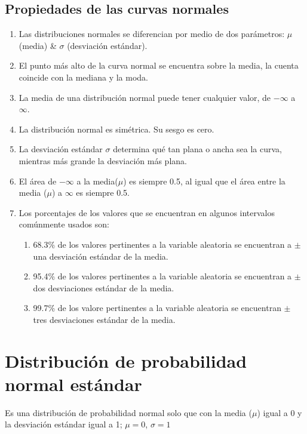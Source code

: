 \documentclass{article}
\begin{document}
\subsection{Propiedades de las curvas normales}
\begin{enumerate}
    \item Las distribuciones normales se diferencian por medio de dos parámetros: $\mu$ (media) \& $\sigma$ (desviación estándar).
    \item El punto más alto de la curva normal se encuentra sobre la media, la cuenta coincide con la mediana y la moda.
    \item La media de una distribución normal puede tener cualquier valor, de $-\infty$ a $\infty$.
    \item La distribución normal es simétrica. Su sesgo es cero. 
    \item La desviación estándar $\sigma$ determina qué tan plana o ancha sea la curva, mientras más grande la desviación más plana. 
    \item El área de $-\infty$ a la media($\mu$) es siempre 0.5, al igual que el área entre la media ($\mu$) a $\infty$ es siempre 0.5.
    \item Los porcentajes de los valores que se encuentran en algunos intervalos comúnmente usados son: 
        \begin{enumerate}
            \item 68.3\% de los valores pertinentes a la variable aleatoria se encuentran a $\pm$ una desviación estándar de la media. 
            \item 95.4\% de los valores pertinentes a la variable aleatoria se encuentran a $\pm$ dos desviaciones estándar de la media. 
            \item 99.7\% de los valore pertinentes a la variable aleatoria se encuentran $\pm$ tres desviaciones estándar de la media.
        \end{enumerate}
\end{enumerate}


\hrulefill
\section{Distribución de probabilidad normal estándar}
Es una distribución de probabilidad normal solo que con la media ($\mu$) igual a 0 y la desviación estándar igual a 1; $\mu=0$, $\sigma=1$ 
\end{document}
